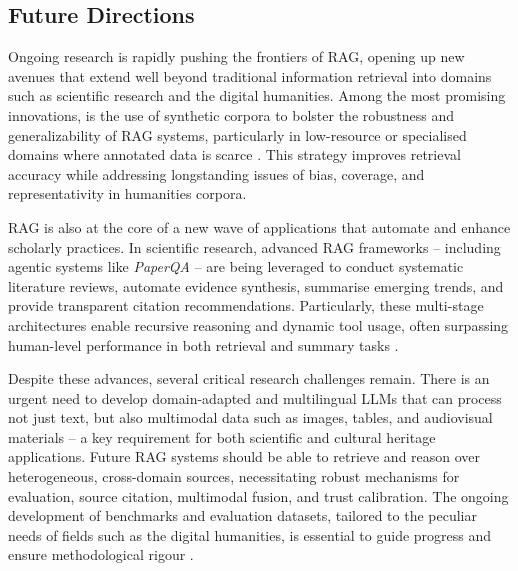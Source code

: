 \begin{spacing}{1.5}
\section{Future Directions}
Ongoing research is rapidly pushing the frontiers of RAG, opening up new avenues  that extend well beyond traditional information retrieval into domains such as scientific research and the digital humanities. Among the most promising innovations, is the use of synthetic corpora to bolster the robustness and generalizability of RAG systems, particularly in low-resource or specialised domains where annotated data is scarce \citep{bor-woei_generative_2024}. This strategy improves retrieval accuracy while addressing longstanding issues of bias, coverage, and representativity in humanities corpora. 

RAG is also at the core of a new wave of applications that automate and enhance scholarly practices. In scientific research, advanced RAG frameworks -- including agentic systems like \textit{PaperQA} \citep{lala_paperqa_2023} -- are being leveraged to conduct systematic literature reviews, automate evidence synthesis, summarise emerging trends, and provide transparent citation recommendations. Particularly, these multi-stage architectures enable recursive reasoning and dynamic tool usage, often surpassing human-level performance in both retrieval and summary tasks \citep{skarlinski_language_2024}. 

Despite these advances, several critical research challenges remain. There is an urgent need to develop domain-adapted and multilingual LLMs that can process not just text, but also multimodal data such as images, tables, and audiovisual materials -- a key requirement for both scientific and cultural heritage applications. Future RAG systems should be able to retrieve and reason over heterogeneous, cross-domain sources, necessitating robust mechanisms for evaluation, source citation, multimodal fusion, and trust calibration. The ongoing development of benchmarks and evaluation datasets, tailored to the peculiar needs of fields such as the digital humanities, is essential to guide progress and ensure methodological rigour \citep{yue_survey_2025}.


\end{spacing}
